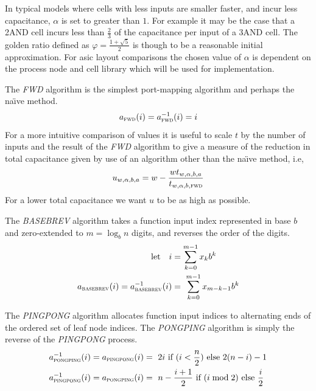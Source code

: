 \documentclass[11pt,twoside]{article}
\begin{document}
In typical models where cells with less inputs are smaller faster, and incur
less capacitance, $\alpha$ is set to greater than $1$.
For example it may be the case that a 2AND cell incurs less than $\frac{2}{3}$
of the capacitance per input of a 3AND cell.
The golden ratio defined as $\varphi = \frac{1 + \sqrt 5}{2}$ is though to be a
reasonable initial approximation.
For \gls{asic} layout comparisons the chosen value of $\alpha$ is dependent on
the process node and cell library which will be used for implementation.

The \textit{FWD} algorithm is the simplest port-mapping algorithm and perhaps
the na\"{\i}ve method.
\begin{align} \label{eq:a_fwd}
a_{\textsc{fwd}}(i) = a_{\textsc{fwd}}^{-1}(i) = i
\end{align}
For a more intuitive comparison of values it is useful to scale $t$ by the
number of inputs and the result of the \textit{FWD} algorithm to give a measure
of the reduction in total capacitance given by use of an algorithm other than
the na\"{\i}ve method, i.e,
\begin{align} \label{eq:u}
u_{w,\alpha,b,a} = w - \frac{wt_{w,\alpha,b,a}}{t_{w,\alpha,b,\textsc{fwd}}}
\end{align}
For a lower total capacitance we want $u$ to be as high as possible.

The \textit{BASEBREV} algorithm takes a function input index represented in
base $b$ and zero-extended to $m = \log_bn$ digits, and reverses the order of
the digits.
\begin{align}
\text{let}\quad i &= \sum\limits_{k = 0}^{m-1} x_k b^k \\
\label{eq:a_basebrev}
a_{\textsc{basebrev}}(i) = a_{\textsc{basebrev}}^{-1}(i) &= \
    \sum\limits_{k = 0}^{m-1} x_{m-k-1} b^k
\end{align}

The \textit{PINGPONG} algorithm allocates function input indices to
alternating ends of the ordered set of leaf node indices.
The \textit{PONGPING} algorithm is simply the reverse of the  \textit{PINGPONG}
process.
\begin{align}
\label{eq:a_pingpong}
a_{\textsc{pongping}}^{-1}(i) = a_{\textsc{pingpong}}(i) &= \
    2i\ \text{if}\ (i < \frac{n}{2})\ \text{else}\ 2(n-i)-1 \\
\label{eq:a_pongping}
a_{\textsc{pingpong}}^{-1}(i) = a_{\textsc{pongping}}(i) &= \
    n-\frac{i+1}{2}\ \text{if}\ (i \bmod 2)\ \text{else}\ \frac{i}{2}
\end{align}
\end{document}
